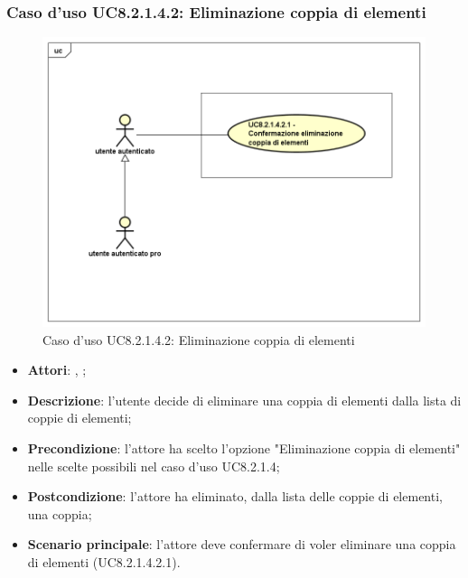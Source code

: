	\subsubsection{Caso d'uso UC8.2.1.4.2: Eliminazione coppia di elementi}
	\label{UC8.2.1.4.2}
	\begin{figure}[h]
		\centering
		\includegraphics[scale=0.5,keepaspectratio]{UML/UC8_2_1_4_2.png}
		\caption{Caso d'uso UC8.2.1.4.2: Eliminazione coppia di elementi}
	\end{figure}
	\FloatBarrier
	\begin{itemize}
		\item \textbf{Attori}: \uau, \uaupro;
		\item \textbf{Descrizione}: l'utente decide di eliminare una coppia di elementi dalla lista di coppie di elementi;
		\item \textbf{Precondizione}: l'attore ha scelto l'opzione "Eliminazione coppia di elementi" nelle scelte possibili nel caso d'uso UC8.2.1.4;
		\item \textbf{Postcondizione}: l'attore ha eliminato, dalla lista delle coppie di elementi, una coppia;
		\item \textbf{Scenario principale}: l'attore deve confermare di voler eliminare una coppia di elementi (UC8.2.1.4.2.1). 
	\end{itemize}
	
